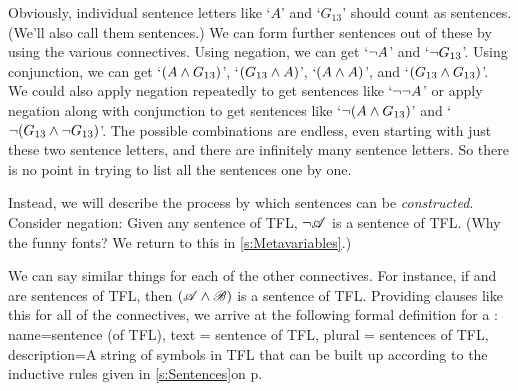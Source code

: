 Obviously, individual sentence letters like `$A$' and `$G_{13}$' should count as sentences. (We'll also call them  sentences.) We can form further sentences out of these by using the various connectives. Using negation, we can get `$\neg A$' and `$\neg G_{13}$'. Using conjunction, we can get `$(A \wedge G_{13})$', `$(G_{13} \wedge A)$', `$(A \wedge A)$', and `$(G_{13} \wedge G_{13})$'. We could also apply negation repeatedly to get sentences like `$\neg \neg A$' or apply negation along with conjunction to get sentences like `$\neg(A \wedge G_{13})$' and `$\neg(G_{13} \wedge \neg G_{13})$'. The possible combinations are endless, even starting with just these two sentence letters, and there are infinitely many sentence letters. So there is no point in trying to list all the sentences one by one.

Instead, we will describe the process by which sentences can be \emph{constructed}. Consider negation: Given any sentence  of TFL, $\neg\mathscr{A}$ is a sentence of TFL. (Why the funny fonts? We return to this in \cref{s:Metavariables}.)

We can say similar things for each of the other connectives. For instance, if  and  are sentences of TFL, then $(\mathscr{A}\wedge\mathscr{B})$ is a sentence of TFL. Providing clauses like this for all of the connectives, we arrive at the following formal definition for a :
{
name=sentence (of TFL),
text = sentence of TFL,
plural = sentences of TFL,
description={A string of symbols in TFL that can be built up according to the inductive rules given \ifHTMLtarget in \cref{s:Sentences}\else on p.~\pageref{TFLsentences}\fi}
}

